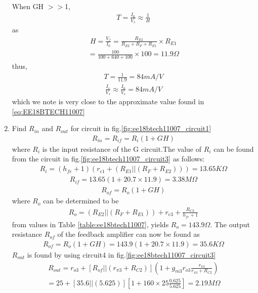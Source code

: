 \begin{enumerate}[label=\thesection.\arabic*.,ref=\thesection.\theenumi]
\\
\solution When GH $>>$1,
\begin{align}
    T =\frac{I_0}{V_s}\approx \frac{1}{H}
\end{align}
as
\begin{align}
    H=\frac{V_f}{I_0}=\frac{R_{E2}}{R_{E2}+R_F+R_{E1}} \times R_{E1}
\end{align}
\begin{align}
    =\frac{100}{100+640+100}\times 100=11.9\Omega
\end{align}
thus,
\begin{align}
   T =\frac{1}{11.9}=84mA/V
\end{align}
\begin{align}
 \frac{I_c}{V_s}\approx\frac{I_0}{V_s}=84 mA/V
 \end{align}
 which  we note is very close to the approximate value found in \eqref{eq:EE18BTECH11007} 
\item Find $R_{in}$ and $R_{out}$ for circuit in  fig.\ref{fig:ee18btech11007_circuit1}
\\
\solution
\begin{align}
    R_{in} =R_{if}=R_i(1+GH)
\end{align}
where $R_i$ is the input resistance of the G circuit.The value of $R_i$ can be found from the circuit in fig.\ref{fig:ee18btech11007_circuit3} as follows:
\begin{align}
    R_i=(h_{fe}+1)(r_{e1}+(R_{E1}||(R_F+R_{E2})))=13.65K\Omega
\end{align} 
\begin{align}
    R_{if}=13.65(1+20.7\times11.9)=3.38M\Omega
\end{align}
\begin{align}
    R_{of}=R_o(1+GH)
\end{align}
where $R_o$ can be determined to be 
 \begin{align}
    R_o=(R_{E2}||(R_F+R_{E1}))+r_{e3}+\frac{R_{C2}}{h_{fe}+1}
\end{align}
from values in Table \ref{table:ee18btech11007}, yields $R_o = 143.9 \Omega$. The output resistance $R_{of}$ of the feedback amplifier can now be found as
\begin{align}
    R_{of}=R_o(1+GH)=143.9(1+20.7\times11.9)=35.6K\Omega
\end{align}
$R_{out}$ is found by using circuit4 in fig.\ref{fig:ee18btech11007_circuit3}
\begin{align}
    R_{out}=r_{o3}+[R_{of}||(r_{\pi3}+R_{C2})](1+g_{m3}r_{o3}\frac{r_{\pi3}}{r_{\pi3}+R_{C2}})
\end{align}
\begin{align}
=25+[35.6||(5.625)][1+160\times25\frac{0.625}{5.625}]=2.19M\Omega \end{align}


\end{enumerate}
